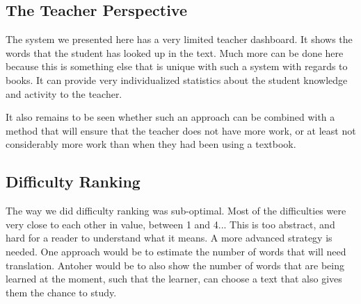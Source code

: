 \subsection{The Teacher Perspective}
The system we presented here has a very limited teacher dashboard. It shows the words that the student has looked up in the text. Much more can be done here because this is something else that is unique with such a system with regards to books. It can provide very individualized statistics about the student knowledge and activity to the teacher. 

It also remains to be seen whether such an approach can be combined with a method that will ensure that the teacher does not have more work, or at least not considerably more work than when they had been using a textbook. 

\subsection{Difficulty Ranking}
The way we did difficulty ranking was sub-optimal. Most of the difficulties were very close to each other in value, between 1 and 4... This is too abstract, and hard for a reader to understand what it means. A more advanced strategy is needed. One approach would be to estimate the number of words that will need translation. Antoher would be to also show the number of words that are being learned at the moment, such that the learner, can choose a text that also gives them the chance to study. 
